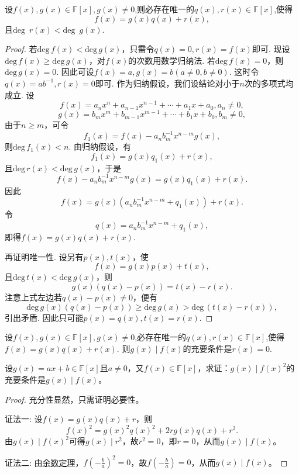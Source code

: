 \documentclass[../../main.tex]{subfiles}
\begin{document}
\begin{theorem}[多项式的带余除法]\label{theorem:多项式的带余除法}
设\(f(x),g(x)\in\mathbb{F}[x],g(x)\neq 0\),则必存在唯一的\(q(x),r(x)\in\mathbb{F}[x]\),使得
\[
f(x)=g(x)q(x)+r(x),
\]
且\(\text{deg }\,r(x)<\text{deg }\,g(x)\).
\end{theorem}
\begin{proof}
若\(\mathrm{deg }\,f(x)<\mathrm{deg }\,g(x)\)，只需令\(q(x)=0,r(x)=f(x)\)即可.
现设\(\mathrm{deg }\,f(x)\geq\mathrm{deg }\,g(x)\)，对\(f(x)\)的次数用数学归纳法. 若\(\mathrm{deg }\,f(x)=0\)，则\(\mathrm{deg }\,g(x)=0\). 因此可设\(f(x)=a,g(x)=b(a\neq 0,b\neq 0)\). 这时令\(q(x)=ab^{-1},r(x)=0\)即可. 作为归纳假设，我们设结论对小于\(n\)次的多项式均成立. 设
\[
f(x)=a_nx^n + a_{n - 1}x^{n - 1}+\cdots+a_1x + a_0, a_n\neq 0,
\]
\[
g(x)=b_mx^m + b_{m - 1}x^{m - 1}+\cdots+b_1x + b_0, b_m\neq 0,
\]
由于\(n\geq m\)，可令
\[
f_1(x)=f(x)-a_nb_m^{-1}x^{n - m}g(x),
\]
则\(\mathrm{deg }\,f_1(x)<n\). 由归纳假设，有
\[
f_1(x)=g(x)q_1(x)+r(x),
\]
且\(\mathrm{deg }\,r(x)<\mathrm{deg }\,g(x)\)，于是
\[
f(x)-a_nb_m^{-1}x^{n - m}g(x)=g(x)q_1(x)+r(x).
\]
因此
\[
f(x)=g(x)(a_nb_m^{-1}x^{n - m}+q_1(x))+r(x).
\]
令
\[
q(x)=a_nb_m^{-1}x^{n - m}+q_1(x),
\]
即得$f(x)=g(x)q(x)+r(x)$.

再证明唯一性. 设另有\(p(x),t(x)\)，使
\[
f(x)=g(x)p(x)+t(x),
\]
且\(\mathrm{deg }\,t(x)<\mathrm{deg }\,g(x)\)，则
\[
g(x)(q(x)-p(x))=t(x)-r(x).
\]
注意上式左边若\(q(x)-p(x)\neq 0\)，便有
\[
\mathrm{deg }\,g(x)(q(x)-p(x))\geq\mathrm{deg }\,g(x)>\mathrm{deg }\,(t(x)-r(x)),
\]
引出矛盾. 因此只可能\(p(x)=q(x),t(x)=r(x)\).
\end{proof}

\begin{corollary}\label{corollary:整除关于多项式的带余除法的充要条件}
设\(f(x),g(x)\in\mathbb{F}[x],g(x)\neq 0\),必存在唯一的\(q(x),r(x)\in\mathbb{F}[x]\),使得$f(x)=g(x)q(x)+r(x)$. 
则\(g(x)\mid f(x)\)的充要条件是\(r(x)=0\).
\end{corollary}

\begin{example}
设\(g(x)=ax + b\in\mathbb{F}[x]\)且\(a\neq0\)，又\(f(x)\in\mathbb{F}[x]\)，求证：\(g(x)\mid f(x)^2\)的充要条件是\(g(x)\mid f(x)\)。
\end{example}
\begin{proof}
充分性显然，只需证明必要性。

{\color{blue}证法一:}
设\(f(x)=g(x)q(x)+r\)，则
\[
f(x)^2 = g(x)^2q(x)^2 + 2rg(x)q(x)+r^2.
\]
由\(g(x)\mid f(x)^2\)可得\(g(x)\mid r^2\)，故\(r^2 = 0\)，即\(r = 0\)，从而\(g(x)\mid f(x)\)。

{\color{blue}证法二:}
由\hyperref[theorem:余数定理]{余数定理}，\(f\left(-\frac{b}{a}\right)^2 = 0\)，故\(f\left(-\frac{b}{a}\right)= 0\)，从而\(g(x)\mid f(x)\)。
\end{proof}
\end{document}
